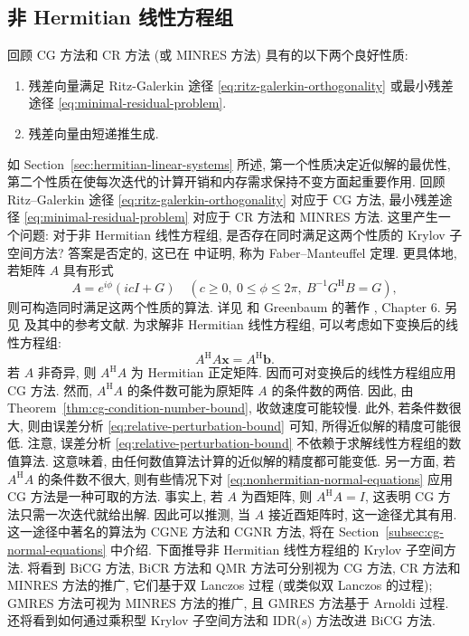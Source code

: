\subsection{{非 Hermitian 线性方程组}}\label{sec:nonhermitian-linear-systems}
{回顾 CG 方法和 CR 方法 (或 MINRES 方法) 具有的以下两个良好性质:}
\begin{enumerate}
\item{残差向量满足 Ritz-Galerkin 途径 \eqref{eq:ritz-galerkin-orthogonality} 或最小残差途径 \eqref{eq:minimal-residual-problem}.}
\item{残差向量由短递推生成.}
\end{enumerate}
{如 Section\ \ref{sec:hermitian-linear-systems} 所述, 第一个性质决定近似解的最优性, 第二个性质在使每次迭代的计算开销和内存需求保持不变方面起重要作用. 回顾 Ritz--Galerkin 途径 \eqref{eq:ritz-galerkin-orthogonality} 对应于 CG 方法, 最小残差途径 \eqref{eq:minimal-residual-problem} 对应于 CR 方法和 MINRES 方法.}
{\leavevmode{}\label{idx:chapter-03-section-03:faber-manteuffel-limitation}这里产生一个问题: 对于非 Hermitian 线性方程组, 是否存在同时满足这两个性质的 Krylov 子空间方法? 答案是否定的, 这已在  中证明, 称为 Faber--Manteuffel 定理. 更具体地, 若矩阵 $A$ 具有形式}
\[A=e^{i\phi}(icI+G)\quad(c\ge0,\ 0\le\phi\le2\pi,\ B^{-1}G^{\mathrm H}B=G),\]
{则可构造同时满足这两个性质的算法. 详见  和 Greenbaum 的著作 , Chapter 6. 另见  及其中的参考文献.}
{为求解非 Hermitian 线性方程组, 可以考虑如下变换后的线性方程组:}
\begin{equation}\label{eq:nonhermitian-normal-equations}A^{\mathrm H}A\bm x=A^{\mathrm H}\bm b.\end{equation}
{若 $A$ 非奇异, 则 $A^{\mathrm H}A$ 为 Hermitian 正定矩阵. 因而可对变换后的线性方程组应用 CG 方法. 然而, $A^{\mathrm H}A$ 的条件数可能为原矩阵 $A$ 的条件数的两倍. 因此, 由 Theorem\ \ref{thm:cg-condition-number-bound}, 收敛速度可能较慢. 此外, 若条件数很大, 则由误差分析 \eqref{eq:relative-perturbation-bound} 可知, 所得近似解的精度可能很低. 注意, 误差分析 \eqref{eq:relative-perturbation-bound} 不依赖于求解线性方程组的数值算法. 这意味着, 由任何数值算法计算的近似解的精度都可能变低.}
{另一方面, 若 $A^{\mathrm H}A$ 的条件数不很大, 则有些情况下对 \eqref{eq:nonhermitian-normal-equations} 应用 CG 方法是一种可取的方法. 事实上, 若 $A$ 为酉矩阵, 则 $A^{\mathrm H}A=I$, 这表明 CG 方法只需一次迭代就给出解. 因此可以推测, 当 $A$ 接近酉矩阵时, 这一途径尤其有用. 这一途径中著名的算法为 CGNE 方法和 CGNR 方法, 将在 Section\ \ref{subsec:cg-normal-equations} 中介绍.}
{下面推导非 Hermitian 线性方程组的 Krylov 子空间方法. 将看到 BiCG 方法, BiCR 方法和 QMR 方法可分别视为 CG 方法, CR 方法和 MINRES 方法的推广, 它们基于双 Lanczos 过程 (或类似双 Lanczos 的过程); GMRES 方法可视为 MINRES 方法的推广, 且 GMRES 方法基于 Arnoldi 过程. 还将看到如何通过乘积型 Krylov 子空间方法和 IDR($s$) 方法改进 BiCG 方法.}
